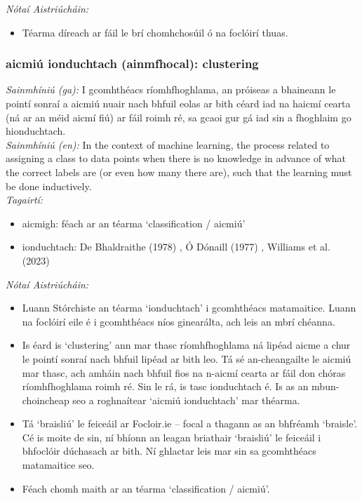 \noindent \textit{Nótaí Aistriúcháin:}
\begin{itemize}
	\item Téarma díreach ar fáil le brí chomhchosúil ó na foclóirí thuas.
\end{itemize}


\subsubsection*{aicmiú ionduchtach (ainmfhocal): clustering}
 \noindent \textit{Sainmhíniú (ga):} I gcomhthéacs ríomhfhoghlama, an próiseas a bhaineann le pointí sonraí a aicmiú nuair nach bhfuil eolas ar bith céard iad na haicmí cearta (ná ar an méid aicmí fiú) ar fáil roimh ré, sa gcaoi gur gá iad sin a fhoghlaim go hionduchtach.
\\
 \noindent \textit{Sainmhíniú (en):} In the context of machine learning, the process related to assigning a class to data points when there is no knowledge in advance of what the correct labels are (or even how many there are), such that the learning must be done inductively.
\\
 \noindent \textit{Tagairtí:}
\begin{itemize}
	\item aicmigh: féach ar an téarma `classification / aicmiú'
	\item ionduchtach: De Bhaldraithe (1978) \cite{de-bhaldraithe}, Ó Dónaill (1977) \cite{odonaill}, Williams et al. (2023) \cite{storchiste}
\end{itemize}

 \noindent \textit{Nótaí Aistriúcháin:}
\begin{itemize}
	\item Luann Stórchiste an téarma `ionduchtach' i gcomhthéacs matamaitice. Luann na foclóirí eile é i gcomhthéacs níos ginearálta, ach leis an mbrí chéanna.
	\item Is éard is `clustering' ann mar thasc ríomhfhoghlama ná lipéad aicme a chur le pointí sonraí nach bhfuil lipéad ar bith leo. Tá sé an-cheangailte le aicmiú mar thasc, ach amháin nach bhfuil fios na n-aicmí cearta ar fáil don chóras ríomhfhoghlama roimh ré. Sin le rá, is tasc ionduchtach é. Is as an mbun-choincheap seo a roghnaítear `aicmiú ionduchtach' mar théarma.
	\item Tá `braisliú' le feiceáil ar Focloir.ie -- focal a thagann as an bhfréamh `braisle'. Cé is moite de sin, ní bhíonn an leagan briathair `braisliú' le feiceáil i bhfoclóir dúchasach ar bith. Ní ghlactar leis mar sin sa gcomhthéacs matamaitice seo.
	\item Féach chomh maith ar an téarma `classification / aicmiú'.
\end{itemize}


